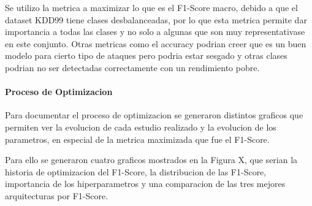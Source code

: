 \documentclass[12pt,a4paper]{article}
\begin{document}
Se utilizo la metrica a maximizar lo que es el F1-Score macro, debido a que el dataset KDD99 tiene clases desbalanceadas,
por lo que esta metrica permite dar importancia a todas las clases y no solo a algunas que son muy representativase
en este conjunto. Otras metricas como el accuracy podrian creer que es un buen modelo para cierto tipo de ataques
pero podria estar sesgado y otras clases podrian no ser detectadas correctamente con un rendimiento pobre.

\paragraph{Proceso de Optimizacion}

Para documentar el proceso de optimizacion se generaron distintos graficos que permiten ver la evolucion de cada estudio
realizado y la evolucion de los parametros, en especial de la metrica maximizada que fue el F1-Score.

Para ello se generaron cuatro graficos mostrados en la Figura X, que serian la historia de optimizacion del F1-Score,
la distribucion de las F1-Score, importancia de los hiperparametros y una comparacion de las tres mejores arquitecturas por F1-Score.
\end{document}

